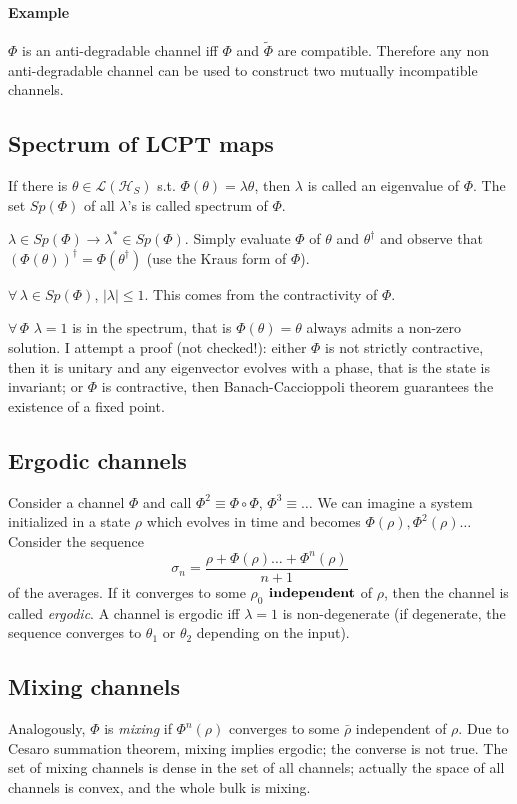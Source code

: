 \documentclass[a4paper, 11pt]{article}
\newcommand{\HH}{\mathcal{H}}
\begin{document}
	\paragraph{Example}
	$\Phi$ is an anti-degradable channel iff $\Phi$ and $\tilde{\Phi}$ are compatible. Therefore any non anti-degradable channel can be used to construct two mutually incompatible channels.
	
	\subsection{Spectrum of LCPT maps}
	If there is $\theta\in \mathcal{L}(\HH_S)$ s.t. $\Phi(\theta) = \lambda \theta$, then $\lambda$ is called an eigenvalue of $\Phi$. The set $Sp(\Phi)$ of all $\lambda$'s is called spectrum of $\Phi$.
	
	$\lambda\in Sp(\Phi) \rightarrow \lambda^* \in Sp(\Phi)$. Simply evaluate $\Phi$ of $\theta$ and $\theta^\dagger$ and observe that $(\Phi(\theta))^\dagger = \Phi(\theta^\dagger)$ (use the Kraus form of $\Phi$).
	
	$\forall\, \lambda\in Sp(\Phi)$, $|\lambda|\le 1$. This comes from the contractivity of $\Phi$.
	
	$\forall\,\Phi$ $\lambda=1$ is in the spectrum, that is $\Phi(\theta)=\theta$ always admits a non-zero solution. I attempt a proof (not checked!): either $\Phi$ is not strictly contractive, then it is unitary and any eigenvector evolves with a phase, that is the state is invariant; or $\Phi$ is contractive, then Banach-Caccioppoli theorem guarantees the existence of a fixed point.
	
	\subsection{Ergodic channels}
	Consider a channel $\Phi$ and call $\Phi^2\equiv \Phi\circ\Phi$, $\Phi^3\equiv\dots$ We can imagine a system initialized in a state $\rho$ which evolves in time and becomes $\Phi(\rho),\Phi^2(\rho)\dots$ Consider the sequence
	\[ \sigma_n = \dfrac{\rho + \Phi(\rho) \dots +\Phi^n(\rho)}{n+1} \]
	of the averages. If it converges to some $\rho_0$ $\bf{independent}$ of $\rho$, then the channel is called \emph{ergodic}. A channel is ergodic iff $\lambda=1$ is non-degenerate (if degenerate, the sequence converges to $\theta_1$ or $\theta_2$ depending on the input).
	
	\subsection{Mixing channels}
	Analogously, $\Phi$ is \emph{mixing} if $\Phi^n(\rho)$ converges to some $\bar{\rho}$ independent of $\rho$. Due to Cesaro summation theorem, mixing implies ergodic; the converse is not true. The set of mixing channels is dense in the set of all channels; actually the space of all channels is convex, and the whole bulk is mixing.
	
\end{document}
